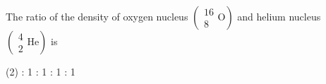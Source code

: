 \item The ratio of the density of oxygen nucleus \( \left( \begin{matrix} 16 \\ 8 \end{matrix} \text{O} \right) \) and helium nucleus \( \left( \begin{matrix} 4 \\ 2 \end{matrix} \text{He} \right) \) is
    \begin{tasks}(2)
         : 1
         : 1
         : 1
         : 1
    \end{tasks}